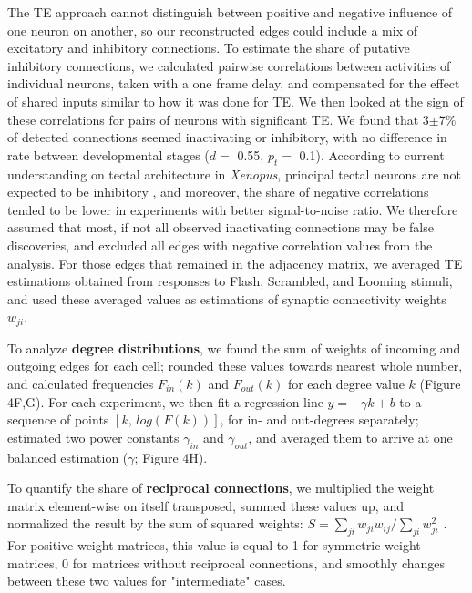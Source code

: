 \documentclass{article}
\begin{document}
The TE approach cannot distinguish between positive and negative influence of one neuron on another, so our reconstructed edges could include a mix of excitatory and inhibitory connections. To estimate the share of putative inhibitory connections, we calculated pairwise correlations between activities of individual neurons, taken with a one frame delay, and compensated for the effect of shared inputs similar to how it was done for TE. We then looked at the sign of these correlations for pairs of neurons with significant TE. We found that 3$\pm$7\% of detected connections seemed inactivating or inhibitory, with no difference in rate between developmental stages ($d=$ 0.55, $p_t=$ 0.1). According to current understanding on tectal architecture in \textit{Xenopus}, principal tectal neurons are not expected to be inhibitory \citep{bell2011polyamines}, and moreover, the share of negative correlations tended to be lower in experiments with better signal-to-noise ratio. We therefore assumed that most, if not all observed inactivating connections may be false discoveries, and excluded all edges with negative correlation values from the analysis. For those edges that remained in the adjacency matrix, we averaged TE estimations obtained from responses to Flash, Scrambled, and Looming stimuli, and used these averaged values as estimations of synaptic connectivity weights $w_{ji}$.

To analyze \textbf{degree distributions}, we found the sum of weights of incoming and outgoing edges for each cell; rounded these values towards nearest whole number, and calculated frequencies $F_{in}(k)$ and $F_{out}(k)$ for each degree value $k$ (Figure 4F,G). For each experiment, we then fit a regression line $y = -\gamma k + b$ to a sequence of points $[k , \, log(F(k)) ]$, for in- and out-degrees separately; estimated two power constants $\gamma_{in}$ and $\gamma_{out}$, and averaged them to arrive at one balanced estimation ($\gamma$; Figure 4H).

To quantify the share of \textbf{reciprocal connections}, we multiplied the weight matrix element-wise on itself transposed, summed these values up, and normalized the result by the sum of squared weights: $S=\sum_{ji}{w_{ji} w_{ij}} / \sum_{ji}{w_{ji}^2}$ . For positive weight matrices, this value is equal to 1 for symmetric weight matrices, 0 for matrices without reciprocal connections, and smoothly changes between these two values for "intermediate" cases.
\end{document}
